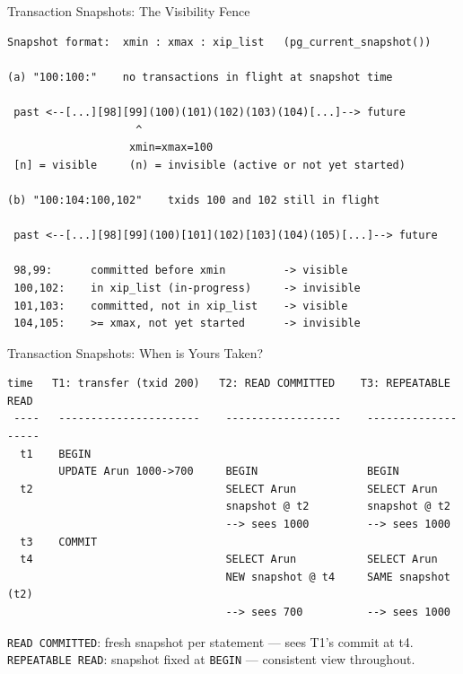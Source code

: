 \documentclass[aspectratio=169,10pt]{beamer}
\begin{document}
\begin{frame}[fragile]{Transaction Snapshots: The Visibility Fence}

\begin{lstlisting}[style=ascii]
Snapshot format:  xmin : xmax : xip_list   (pg_current_snapshot())

(a) "100:100:"    no transactions in flight at snapshot time

 past <--[...][98][99](100)(101)(102)(103)(104)[...]--> future
                    ^
                   xmin=xmax=100
 [n] = visible     (n) = invisible (active or not yet started)

(b) "100:104:100,102"    txids 100 and 102 still in flight

 past <--[...][98][99](100)[101](102)[103](104)(105)[...]--> future

 98,99:      committed before xmin         -> visible
 100,102:    in xip_list (in-progress)     -> invisible
 101,103:    committed, not in xip_list    -> visible
 104,105:    >= xmax, not yet started      -> invisible
\end{lstlisting}

\end{frame}

\begin{frame}[fragile]{Transaction Snapshots: When is Yours Taken?}

\begin{lstlisting}[style=ascii]
 time   T1: transfer (txid 200)   T2: READ COMMITTED    T3: REPEATABLE READ
 ----   ----------------------    ------------------    -------------------
  t1    BEGIN
        UPDATE Arun 1000->700     BEGIN                 BEGIN
  t2                              SELECT Arun           SELECT Arun
                                  snapshot @ t2         snapshot @ t2
                                  --> sees 1000         --> sees 1000
  t3    COMMIT
  t4                              SELECT Arun           SELECT Arun
                                  NEW snapshot @ t4     SAME snapshot (t2)
                                  --> sees 700          --> sees 1000
\end{lstlisting}

{\small \texttt{READ COMMITTED}: fresh snapshot per statement --- sees T1's commit at t4.\\
\texttt{REPEATABLE READ}: snapshot fixed at \texttt{BEGIN} --- consistent view throughout.}

\end{frame}
\end{document}
